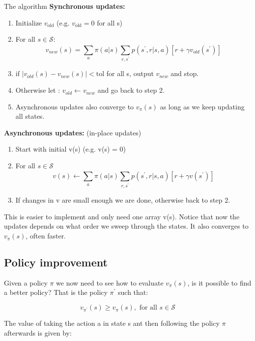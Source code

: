 \begin{wbox}{The algorithm}
\textbf{Synchronous updates:}
 \begin{enumerate}
 	\item Initialize $v_{\text{old}}$ (e.g. $v_{\text{old}} = 0$ for all s)
 	\item For all $s \in \mathcal{S}$:
	 	\begin{equation}
	 		v_{new}(s) = \sum_{a}^{} \pi (a|s) \sum_{r, s^{\prime}}^{} p(s^{\prime},r|s,a)[r + \gamma v_{old} (s^{\prime})]
	 	\end{equation}
	 \item if $|v_{old}(s) - v_{new}(s)| < \text{tol}$ for all s, output $v_{new} $ and stop.  
	 \item Otherwise let : $v_{old} \leftarrow v_{new}$ and go back to step 2. 
	 \item  Asynchronous updates also converge to $v_\pi(s)$ as long as we keep updating all states.
 \end{enumerate}
\textbf{Asynchronous updates: } (in-place updates)
\begin{enumerate}
	\item Start with initial v(s) (e.g. v(s) = 0)
	\item For all $s \in \mathcal{S}$
		\begin{equation}
			v(s) \leftarrow \sum_{a}^{}\pi(a|s) \sum_{r, s^{\prime}}^{} p(s^{\prime},r|s,a)[r+\gamma v(s^{\prime})]
		\end{equation}
	\item If changes in v are small enough we are done, otherwise back to step 2. 
\end{enumerate}
This is easier to implement and only need one array v(s). Notice that now the updates depends on what order we sweep through the states. It also converges to $v_\pi (s)$, often faster. 
\end{wbox}

\subsection{Policy improvement}
Given a policy $\pi$ we now need to see how to evaluate $v_\pi(s)$, is it possible to find a better policy? That is the policy $\pi^{\prime}$ such that:

	\begin{equation}
		v_{\pi^{\prime}}(s) \ge v_\pi(s), \text{ for all } s \in \mathcal{S}
	\end{equation}

The value of taking the action a in state s ant then following the policy $\pi$ afterwards is given by:

